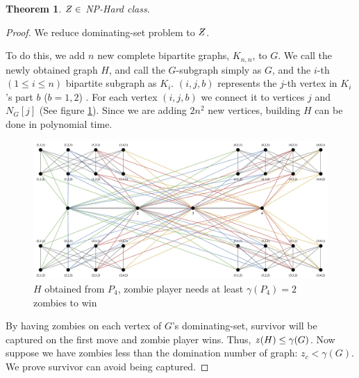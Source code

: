 \documentclass[1p]{elsarticle}
\newtheorem{theorem}{Theorem}
\newcommand{\NPZ}{\ooalign{$Z$\cr\hfil\rule[.8ex]{.3em}{.09ex}\hfil\cr}}
\newcommand{\zn}{\ooalign{$z$\cr\hfil\rule[.5ex]{.2em}{.08ex}\hfil\cr}}
\begin{document}
	\begin{theorem}
		$\NPZ \in$ NP-Hard class.
	\end{theorem}
	\begin{proof}
		We reduce dominating-set problem to $\NPZ$.

		To do this, we add $n$ new complete bipartite graphs, $K_{n,n}$, to $G$. We call the newly obtained graph $H$,
		and call the $G$-subgraph simply as $G$, and the $i$-th $(1 \leq i \leq n)$ bipartite subgraph as $K_i$.
		$(i,j,b)$ represents the $j$-th vertex in $K_i$'s part $b$ ($b = 1,2$) . For each vertex $(i,j,b)$ we connect it
		to vertices $j$ and $N_G[j]$ (See figure \ref{fig:p8}). Since we are adding $2n^2$ new vertices, building $H$
		can be done in polynomial time.

		\begin{figure}[h!]
			\centering
			\includegraphics[width=0.9\linewidth]{sec5.png}
			\caption{$H$ obtained from $P_4$, zombie player needs at least $\gamma(P_4) = 2$ zombies to win}
			\label{fig:p8}
		\end{figure}

		By having zombies on each vertex of $G$'s dominating-set, survivor will be captured on the first move and zombie
		player wins. Thus, $\zn(H) \leq \gamma(G)$. Now suppose we have zombies less than the domination number of
		graph: $z_c < \gamma(G)$. We prove survivor can avoid being captured.


\end{proof}
\end{document}
